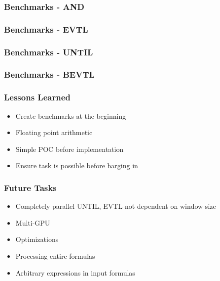 \documentclass[notes=show]{beamer}
\begin{document}
\begin{frame}
\frametitle{Benchmarks - AND}
\end{frame}

\begin{frame}
\frametitle{Benchmarks - EVTL}
\end{frame}

\begin{frame}
\frametitle{Benchmarks - UNTIL}
\end{frame}

\begin{frame}
\frametitle{Benchmarks - BEVTL}
\end{frame}

\begin{frame}
\frametitle{Lessons Learned}
\begin{itemize}
\item Create benchmarks at the beginning
\item Floating point arithmetic
\item Simple POC before implementation
\item Ensure task is possible before barging in
\end{itemize}
\end{frame}

\begin{frame}
\frametitle{Future Tasks}
\begin{itemize}
\item Completely parallel UNTIL, EVTL not dependent on window size
\item Multi-GPU
\item Optimizations
\item Processing entire formulas
\item Arbitrary expressions in input formulas
\end{itemize}
\end{frame}
\end{document}

